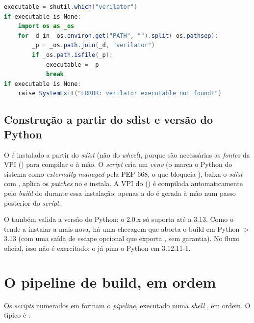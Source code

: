 \begin{lstlisting}[language=Java,caption={Fallback de resolução do verilator (script perl sem extensão).}]
executable = shutil.which("verilator")
if executable is None:
    import os as _os
    for _d in _os.environ.get("PATH", "").split(_os.pathsep):
        _p = _os.path.join(_d, "verilator")
        if _os.path.isfile(_p):
            executable = _p
            break
if executable is None:
    raise SystemExit("ERROR: verilator executable not found!")
\end{lstlisting}

\subsection{Construção a partir do sdist e versão do Python}

O  é instalado a partir do \emph{sdist} (não do \emph{wheel}), porque
são necessárias as \emph{fontes} da VPI ()
para compilar o  à mão. O \emph{script} cria um
\emph{venv} (o  marca o Python do sistema como \emph{externally
managed} pela PEP 668, o que bloqueia ), baixa o \emph{sdist}
com , aplica os \emph{patches} no
 e instala. A VPI do  () é compilada
automaticamente pelo \emph{build} do  durante essa instalação;
apenas a do  é gerada à mão num passo posterior do \emph{script}.

O  também valida a versão do Python: o
 2.0.x só suporta até a 3.13. Como o  tende a instalar
a mais nova, há uma checagem que aborta o build em Python $>$ 3.13 (com uma saída
de escape opcional  que exporta
, sem garantia). No fluxo oficial, isso não é
exercitado: o  já pina o Python em 3.12.11-1.

\section{O pipeline de build, em ordem}
\label{sec:14-pipeline}

Os \emph{scripts} numerados em  formam o \emph{pipeline}, executado
numa \emph{shell} , em ordem. O  típico é
.


